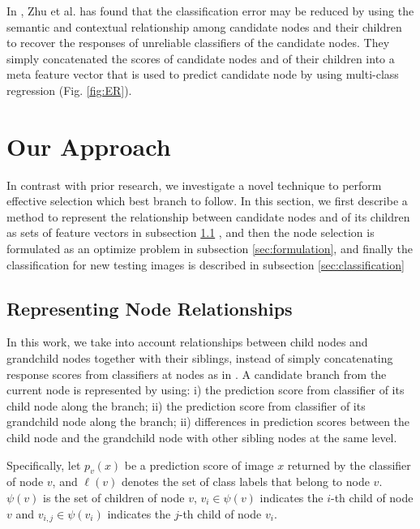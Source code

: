 \documentclass[review]{elsarticle}
\begin{document}
In \cite{Zhu.CVIU2014}, Zhu et al. has found that the classification error may be reduced by using the semantic and contextual relationship among candidate nodes and their children to recover the responses of unreliable classifiers of the candidate nodes. They simply concatenated the scores of candidate nodes and of their children into a meta feature vector that is used to predict candidate node by using multi-class regression (Fig. \ref{fig:ER}).



\section{Our Approach} \label{sec:ourmethod}

In contrast with prior research, we investigate a novel technique to perform effective selection which best branch to follow. 
In this section, we first describe a method to represent the relationship between candidate nodes and of its children as sets of feature vectors in subsection \ref{sec:relationships} , and then the node selection is formulated as an optimize problem in subsection \ref{sec:formulation}, and finally the classification for new testing images is described in subsection \ref{sec:classification}
\subsection{Representing Node Relationships} \label{sec:relationships}
In this work, we take into account relationships between child nodes and grandchild nodes together with their siblings, instead of simply concatenating response scores from classifiers at nodes as in \cite{Zhu.CVIU2014}. A candidate branch from the current node is represented by using: i) the prediction score from classifier of its child node along the branch; ii) the prediction score from classifier of its grandchild node along the branch; ii) differences in prediction scores between the child node and the grandchild node with other sibling nodes at the same level.

Specifically, let $p_v(x)$ be a prediction score of image $x$ returned by the classifier of node $v$, and $\ell(v)$ denotes the set of class labels that belong to node $v$. $\psi(v)$ is the set of children of node $v$, $v_i \in \psi(v)$ indicates the $i$-th child of node $v$  and $v_{i,j} \in \psi(v_i)$ indicates the $j$-th child of node $v_i$.
\end{document}
